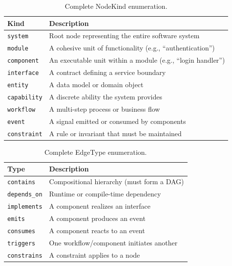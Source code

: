 \documentclass[11pt,a4paper]{article}
\begin{document}
\begin{table}[h]
\centering
\caption{Complete NodeKind enumeration.}
\begin{tabular}{@{}lp{8cm}@{}}
\toprule
\textbf{Kind} & \textbf{Description} \\
\midrule
\texttt{system} & Root node representing the entire software system \\
\texttt{module} & A cohesive unit of functionality (e.g., ``authentication'') \\
\texttt{component} & An executable unit within a module (e.g., ``login handler'') \\
\texttt{interface} & A contract defining a service boundary \\
\texttt{entity} & A data model or domain object \\
\texttt{capability} & A discrete ability the system provides \\
\texttt{workflow} & A multi-step process or business flow \\
\texttt{event} & A signal emitted or consumed by components \\
\texttt{constraint} & A rule or invariant that must be maintained \\
\bottomrule
\end{tabular}
\end{table}

\begin{table}[h]
\centering
\caption{Complete EdgeType enumeration.}
\begin{tabular}{@{}lp{8cm}@{}}
\toprule
\textbf{Type} & \textbf{Description} \\
\midrule
\texttt{contains} & Compositional hierarchy (must form a DAG) \\
\texttt{depends\_on} & Runtime or compile-time dependency \\
\texttt{implements} & A component realizes an interface \\
\texttt{emits} & A component produces an event \\
\texttt{consumes} & A component reacts to an event \\
\texttt{triggers} & One workflow/component initiates another \\
\texttt{constrains} & A constraint applies to a node \\
\bottomrule
\end{tabular}
\end{table}
\end{document}
